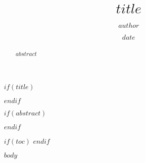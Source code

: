 \documentclass[a4paper,12pt]{article}
\title{$title$}
\author{$author$}
\date{$date$}
\begin{document}
\thispagestyle{fancy}

$if(title)$
\maketitle
$endif$

$if(abstract)$
\begin{abstract}
$abstract$
\end{abstract}
$endif$

$if(toc)$
\tableofcontents
\newpage
$endif$

$body$
\end{document}
